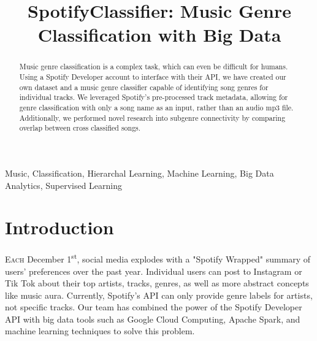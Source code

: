 \documentclass[conference]{IEEEtran}
\begin{document}
\title{SpotifyClassifier: Music Genre Classification with Big Data\\
}

\author{
\and
{}
\and
{}
}

\maketitle
\thispagestyle{plain}
\pagestyle{plain}
\begin{abstract}
Music genre classification is a complex task, which can even be difficult for humans. Using a Spotify Developer account to interface with their API, we have created our own dataset and a music genre classifier capable of identifying song genres for individual tracks. We leveraged Spotify's pre-processed track metadata, allowing for genre classification with only a song name as an input, rather than an audio mp3 file. Additionally, we performed novel research into subgenre connectivity by comparing overlap between cross classified songs.
\end{abstract}

\begin{IEEEkeywords}
Music, Classification, Hierarchal Learning, Machine Learning, Big Data Analytics, Supervised Learning
\end{IEEEkeywords}

\section{Introduction}
\lettrine{E}{ach} December 1\textsuperscript{st}, social media explodes with a "Spotify Wrapped" summary of users' preferences over the past year. Individual users can post to Instagram or Tik Tok about their top artists, tracks, genres, as well as more abstract concepts like music aura. Currently, Spotify's API can only provide genre labels for artists, not specific tracks. Our team has combined the power of the Spotify Developer API with big data tools such as Google Cloud Computing, Apache Spark, and machine learning techniques to solve this problem. 
\end{document}
